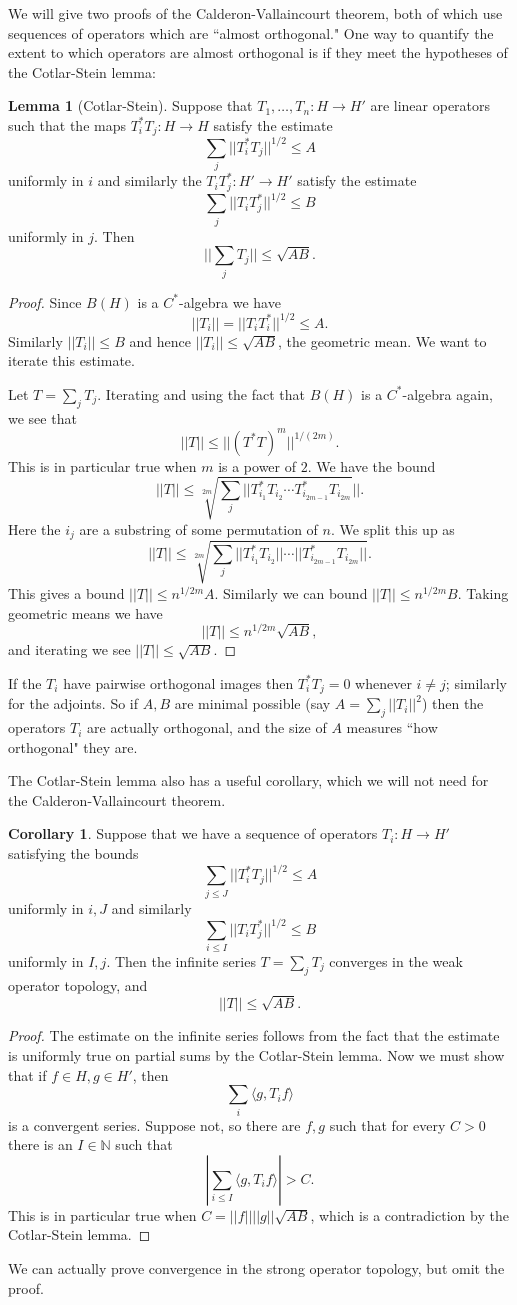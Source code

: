 \documentclass[12pt]{report}
\newcommand{\NN}{\mathbb{N}}
\theoremstyle{definition}
\newtheorem{lemma}[theorem]{Lemma}
\newtheorem{corollary}[theorem]{Corollary}
\begin{document}
We will give two proofs of the Calderon-Vallaincourt theorem, both of which use sequences of operators which are ``almost orthogonal."
One way to quantify the extent to which operators are almost orthogonal is if they meet the hypotheses of the Cotlar-Stein lemma:
\begin{lemma}[Cotlar-Stein]
Suppose that $T_1, \dots, T_n: H \to H'$ are linear operators such that the maps $T_i^*T_j: H \to H$ satisfy the estimate
$$\sum_j ||T_i^*T_j||^{1/2} \leq A$$
uniformly in $i$ and similarly the $T_iT_j^*: H' \to H'$ satisfy the estimate
$$\sum_j ||T_iT_j^*||^{1/2} \leq B$$
uniformly in $j$. Then
$$||\sum_j T_j|| \leq \sqrt{AB}.$$
\end{lemma}
\begin{proof}
Since $B(H)$ is a $C^*$-algebra we have
$$||T_i|| = ||T_iT_i^*||^{1/2} \leq A.$$
Similarly $||T_i|| \leq B$ and hence $||T_i|| \leq \sqrt{AB}$, the geometric mean. We want to iterate this estimate.

Let $T = \sum_j T_j$.
Iterating and using the fact that $B(H)$ is a $C^*$-algebra again, we see that
$$||T|| \leq ||(T^*T)^m||^{1/(2m)}.$$
This is in particular true when $m$ is a power of $2$. We have the bound
$$||T|| \leq \sqrt[2m]{ \sum_j ||T^*_{i_1} T_{i_2} \cdots T^*_{i_{2m-1}} T_{i_{2m}}}||.$$
Here the $i_j$ are a substring of some permutation of $n$.
We split this up as
$$||T|| \leq \sqrt[2m]{ \sum_j ||T^*_{i_1} T_{i_2}|| \cdots ||T^*_{i_{2m-1}} T_{i_{2m}}||}.$$
This gives a bound $||T|| \leq n^{1/2m}A$. Similarly we can bound $||T|| \leq n^{1/2m}B$. Taking geometric means we have
$$||T|| \leq n^{1/2m}\sqrt{AB},$$
and iterating we see $||T|| \leq \sqrt{AB}$.
\end{proof}
If the $T_i$ have pairwise orthogonal images then $T_i^*T_j = 0$ whenever $i \neq j$; similarly for the adjoints.
So if $A,B$ are minimal possible (say $A = \sum_j ||T_i||^2$) then the operators $T_i$ are actually orthogonal, and the size of $A$ measures ``how orthogonal" they are.

The Cotlar-Stein lemma also has a useful corollary, which we will not need for the Calderon-Vallaincourt theorem.
\begin{corollary}
Suppose that we have a sequence of operators $T_i: H \to H'$ satisfying the bounds
$$\sum_{j \leq J} ||T_i^*T_j||^{1/2} \leq A$$
uniformly in $i,J$ and similarly
$$\sum_{i \leq I} ||T_iT_j^*||^{1/2} \leq B$$
uniformly in $I,j$. Then the infinite series $T = \sum_j T_j$ converges in the weak operator topology, and
$$||T|| \leq \sqrt{AB}.$$
\end{corollary}
\begin{proof}
The estimate on the infinite series follows from the fact that the estimate is uniformly true on partial sums by the Cotlar-Stein lemma.
Now we must show that if $f \in H, g \in H'$, then
$$\sum_i \langle g, T_if\rangle$$
is a convergent series. Suppose not, so there are $f,g$ such that for every $C > 0$ there is an $I \in \NN$ such that
$$\left|\sum_{i \leq I} \langle g, T_if\rangle\right| > C.$$
This is in particular true when $C = ||f|| ||g|| \sqrt{AB}$, which is a contradiction by the Cotlar-Stein lemma.
\end{proof}
We can actually prove convergence in the strong operator topology, but omit the proof.
\end{document}
